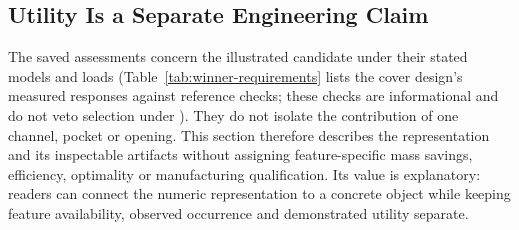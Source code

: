 \subsection{Utility Is a Separate Engineering Claim}
The saved assessments concern the illustrated candidate under their stated models and loads (Table~\ref{tab:winner-requirements} lists the cover design's measured responses against reference checks; these checks are informational and do not veto selection under ). They do not isolate the contribution of one channel, pocket or opening. This section therefore describes the representation and its inspectable artifacts without assigning feature-specific mass savings, efficiency, optimality or manufacturing qualification. Its value is explanatory: readers can connect the numeric representation to a concrete object while keeping feature availability, observed occurrence and demonstrated utility separate.


